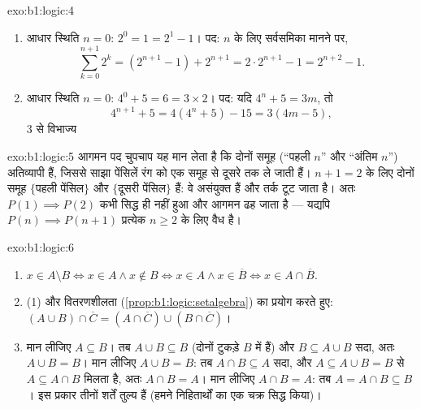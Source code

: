 \begin{solution}{exo:b1:logic:4}
\begin{enumerate}
  \item आधार स्थिति $n = 0$: $2^0 = 1 = 2^1 - 1$। पद: $n$ के लिए सर्वसमिका
  मानने पर,
        \[
        \sum_{k=0}^{n+1} 2^k = (2^{n+1} - 1) + 2^{n+1}
        = 2 \cdot 2^{n+1} - 1 = 2^{n+2} - 1 .
        \]
  \item आधार स्थिति $n = 0$: $4^0 + 5 = 6 = 3 \times 2$। पद: यदि $4^n + 5 =
  3m$, तो
        \[
        4^{n+1} + 5 = 4(4^n + 5) - 15 = 3(4m - 5),
        \]
        $3$ से विभाज्य
\end{enumerate}
\end{solution}

\begin{solution}{exo:b1:logic:5}
आगमन पद चुपचाप यह मान लेता है कि दोनों समूह (``पहली $n$'' और ``अंतिम $n$'')
अतिव्यापी हैं, जिससे साझा पेंसिलें रंग को एक समूह से दूसरे तक ले जाती हैं।
$n + 1 = 2$ के लिए दोनों समूह $\{$पहली पेंसिल$\}$ और $\{$दूसरी पेंसिल$\}$
हैं: वे असंयुक्त हैं और तर्क टूट जाता है। अतः $P(1) \implies P(2)$ कभी सिद्ध
ही नहीं हुआ और आगमन ढह जाता है --- यद्यपि $P(n) \implies P(n+1)$ प्रत्येक $n
\geq 2$ के लिए वैध है।
\end{solution}

\begin{solution}{exo:b1:logic:6}
\begin{enumerate}
  \item $x \in A \setminus B \iff x \in A \land x \notin B \iff x \in
        A \land x \in \overline{B} \iff x \in A \cap \overline{B}$.
  \item (1) और वितरणशीलता (\cref{prop:b1:logic:setalgebra}) का प्रयोग करते
  हुए: $(A \cup B) \cap \overline{C} = (A \cap \overline{C}) \cup (B \cap
  \overline{C})$।
  \item मान लीजिए $A \subseteq B$। तब $A \cup B \subseteq B$ (दोनों टुकड़े
  $B$ में हैं) और $B \subseteq A \cup B$ सदा, अतः $A \cup B = B$। मान लीजिए
  $A \cup B = B$: तब $A \cap B \subseteq A$ सदा, और $A \subseteq A \cup B =
  B$ से $A \subseteq A \cap B$ मिलता है, अतः $A \cap B = A$। मान लीजिए $A
  \cap B = A$: तब $A = A \cap B \subseteq B$। इस प्रकार तीनों शर्तें तुल्य
  हैं (हमने निहितार्थों का एक चक्र सिद्ध किया)।
\end{enumerate}
\end{solution}

